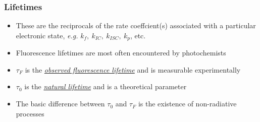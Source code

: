 \documentclass[a4paper,12pt,titlepage]{article}
\begin{document}
\begin{frame}[<+->][label=fluorescencelifetimes]
\frametitle{Lifetimes}
\begin{itemize}
\item These are the reciprocals of the rate coeffcient(s) associated with a particular electronic state, \textit{e.g.} \(k_f, \ k_{IC}, \ k_{ISC}, \ k_p\), etc.
\item Fluorescence lifetimes are most often encountered by photochemists
\item \(\tau_F\) is the \emph{\underline{observed fluorescence lifetime}} and is measurable experimentally
\item \(\tau_0\) is the \emph{\underline{natural lifetime}} and is a theoretical parameter
\item The basic difference between \(\tau_0\) and \(\tau_F\) is the existence of non-radiative processes \hyperlink{experimentallifetimes<3>}{}
\end{itemize}
\begin{columns}[t,onlytextwidth]
\begin{column}{.45\textwidth}
\end{column}
\begin{column}{.5\textwidth}
\end{column}
\end{columns}
\end{frame}

\end{document}
